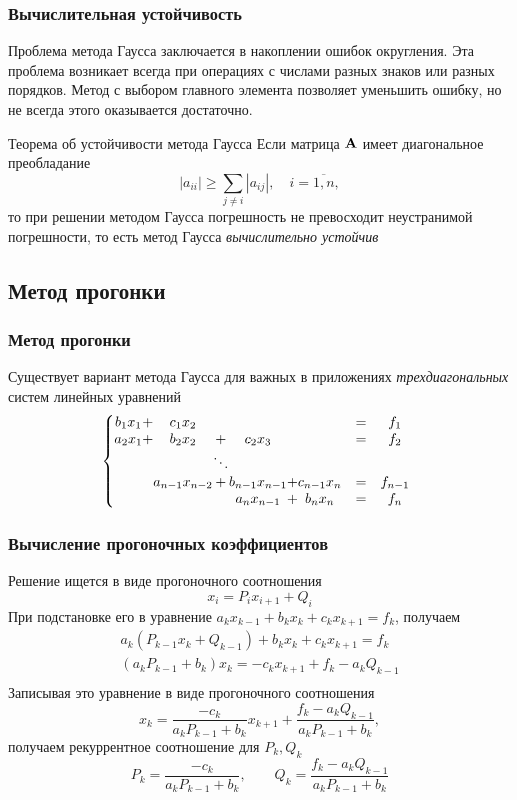 \documentclass[apectratio=43,unicode]{beamer}
\begin{document}
\begin{frame}\frametitle{Вычислительная устойчивость}

	Проблема метода Гаусса заключается в накоплении ошибок округления. Эта проблема возникает всегда при
	операциях с числами разных знаков или разных порядков. Метод с выбором главного элемента позволяет
	уменьшить ошибку, но не всегда этого оказывается достаточно.

	\begin{block}{Теорема об устойчивости метода Гаусса}
		Если матрица $\mathbf{A}$ имеет диагональное преобладание
		\[
			|a_{ii}| \geq \sum_{j \neq i} |a_{ij}|,\quad i = \overline{1,n},
		\]
		то при решении методом Гаусса погрешность не превосходит неустранимой погрешности, то есть
		метод Гаусса \emph{вычислительно устойчив}
	\end{block}
\end{frame}

\subsection{Метод прогонки}
\begin{frame}\frametitle{Метод прогонки}
	Существует вариант метода Гаусса для важных в приложениях \emph{трехдиагональных} систем линейных уравнений
	\[
	\left\{
	\begin{array}{@{}c@{}c@{}c@{}c@{}c@{}c@{}ccc}
	b_1 x_1 &+& c_1 x_2 &&   && &=& f_1\\
	a_2 x_1 &+& b_2 x_2 &+& c_2 x_3 && &=& f_2\\
	&&&\ddots\\
	&& a_{n-1} x_{n-2} &+& b_{n-1} x_{n-1} &+& c_{n-1} x_n &=& f_{n-1}\\
	&&&& a_{n} x_{n-1} &+& b_{n} x_{n} &=& f_{n}\\
	\end{array}
	\right.
	\]
\end{frame}

\begin{frame}\frametitle{Вычисление прогоночных коэффициентов}
	Решение ищется в виде прогоночного соотношения
	\[
	x_{i} = P_{i} x_{i+1} + Q_{i}
	\]
	При подстановке его в уравнение $a_k x_{k-1} + b_k x_k + c_k x_{k+1} = f_k$, получаем
	\begin{align*}
	a_k (P_{k-1} x_k + Q_{k-1}) + b_k x_k + c_k x_{k+1} = f_{k}\\
	(a_k P_{k-1} + b_k) x_k = - c_k x_{k+1} + f_{k} - a_k Q_{k-1}\\
	\end{align*}
	Записывая это уравнение в виде прогоночного соотношения
	\[
	x_{k} = \frac{-c_k}{a_k P_{k-1} + b_k} x_{k+1} + \frac{f_k - a_k
Q_{k-1}}{a_k P_{k-1} + b_k},
	\]
	получаем рекуррентное соотношение для $P_k, Q_k$
	\[
	P_{k} = \frac{-c_k}{a_k P_{k-1} + b_k}, \qquad Q_{k} = \frac{f_k - a_k
Q_{k-1}}{a_k P_{k-1} + b_k}
	\]
\end{frame}
\end{document}
